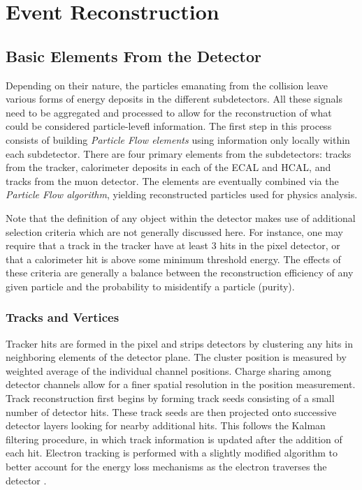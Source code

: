 \chapter{Event Reconstruction}
\label{chap:eventreco}

\section{Basic Elements From the Detector} 

Depending on their nature, the particles emanating from the collision leave various forms of energy deposits in the different subdetectors. All these signals need to be aggregated and processed to allow for the reconstruction of what could be considered particle-levefl information. The first step in this process consists of building \textit{Particle Flow elements} using information only locally within each subdetector. There are four primary elements from the subdetectors: tracks from the tracker, calorimeter deposits in each of the ECAL and HCAL, and tracks from the muon detector. The elements are eventually combined via the \textit{Particle Flow algorithm}, yielding reconstructed particles used for physics analysis.

Note that the definition of any object within the detector makes use of additional selection criteria which are not generally discussed here. For instance, one may require that a track in the tracker have at least 3 hits in the pixel detector, or that a calorimeter hit is above some minimum threshold energy. The effects of these criteria are generally a balance between the reconstruction efficiency of any given particle and the probability to misidentify a particle (purity).

\subsection{Tracks and Vertices}

Tracker hits are formed in the pixel and strips detectors by clustering any hits in neighboring elements of the detector plane. The cluster position is measured by weighted average of the individual channel positions. Charge sharing among detector channels allow for a finer spatial resolution in the position measurement. Track reconstruction first begins by forming track seeds consisting of a small number of detector hits. These track seeds are then projected onto successive detector layers looking for nearby additional hits. This follows the Kalman filtering procedure, in which track information is updated after the addition of each hit. Electron tracking is performed with a slightly modified algorithm to better account for the energy loss mechanisms as the electron traverses the detector \cite{trackerreco}.

